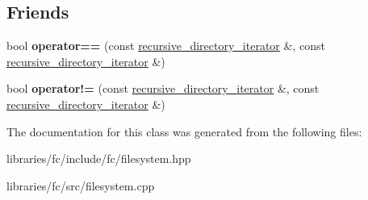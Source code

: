\subsection*{Friends}
\begin{DoxyCompactItemize}
\item 
\mbox{\label{classfc_1_1recursive__directory__iterator_adc8bc6f1774aa444f00f4fd9db33966e}} 
bool {\bfseries operator==} (const \mbox{\hyperlink{classfc_1_1recursive__directory__iterator}{recursive\+\_\+directory\+\_\+iterator}} \&, const \mbox{\hyperlink{classfc_1_1recursive__directory__iterator}{recursive\+\_\+directory\+\_\+iterator}} \&)
\item 
\mbox{\label{classfc_1_1recursive__directory__iterator_a75fcccb40bf90a29f99a57a1ecd4568f}} 
bool {\bfseries operator!=} (const \mbox{\hyperlink{classfc_1_1recursive__directory__iterator}{recursive\+\_\+directory\+\_\+iterator}} \&, const \mbox{\hyperlink{classfc_1_1recursive__directory__iterator}{recursive\+\_\+directory\+\_\+iterator}} \&)
\end{DoxyCompactItemize}


The documentation for this class was generated from the following files\+:\begin{DoxyCompactItemize}
\item 
libraries/fc/include/fc/filesystem.\+hpp\item 
libraries/fc/src/filesystem.\+cpp\end{DoxyCompactItemize}
